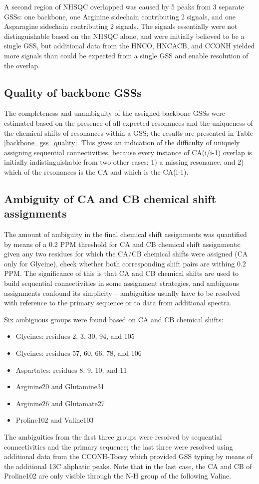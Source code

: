 A second region of NHSQC overlapped was caused by 5 peaks from 3 separate 
GSSs: one backbone, one Arginine sidechain contributing 2 signals, and one
Asparagine sidechain contributing 2 signals.  The signals essentially were not
distinguishable based on the NHSQC alone, and were initially believed to be 
a single GSS, but additional data from the HNCO, HNCACB, and CCONH yielded
more signals than could be expected from a single GSS and enable resolution of
the overlap.

\subsection*{Quality of backbone GSSs}
The completeness and unambiguity of the assigned backbone GSSs were estimated
based on the presence of all expected resonances and the uniqueness of the
chemical shifts of resonances within a GSS; the results are presented in
Table \ref{backbone_gss_quality}.  This gives an indication of the difficulty
of uniquely assigning sequential connectivities, because every instance of
CA(i/i-1) overlap is initially indistinguishable from two other cases: 1) a 
missing resonance, and 2) which of the resonances is the CA and which is the
CA(i-1).

\subsection*{Ambiguity of CA and CB chemical shift assignments}
The amount of ambiguity in the final chemical shift assignments was
quantified by means of a 0.2 PPM threshold for CA and CB chemical shift 
assignments: given any two residues for which the CA/CB chemical shifts 
were assigned (CA only for Glycine), check whether both corresponding
shift pairs are withing 0.2 PPM.  The significance of this is that CA and CB
chemical shifts are used to build sequential connectivities in some assignment
strategies, and ambiguous assignments confound its simplicity -- ambiguities
usually have to be resolved with reference to the primary sequence or to 
data from additional spectra.

Six ambiguous groups were found based on CA and CB chemical shifts:
\begin{itemize}
  \item Glycines: residues 2, 3, 30, 94, and 105
  \item Glycines: residues 57, 60, 66, 78, and 106
  \item Aspartates: residues 8, 9, 10, and 11
  \item Arginine20 and Glutamine31
  \item Arginine26 and Glutamate27
  \item Proline102 and Valine103
\end{itemize}
The ambiguities from the first three groups were resolved by sequential 
connectivities and the primary sequence; the last three were resolved using
additional data from the CCONH-Tocsy which provided GSS typing by means of 
the additional 13C aliphatic peaks.  Note that in the last case, the CA and
CB of Proline102 are only visible through the N-H group of the following
Valine.


